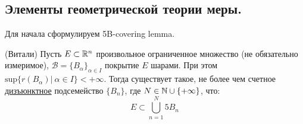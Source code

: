 \subsection{Элементы геометрической теории меры.}

Для начала сформулируем 5B-covering lemma.

\begin{lemma}
    (Витали) Пусть $E \subset \mathbb{R}^n$ произвольное ограниченное множество (не обязательно измеримое), $\mathcal{B} = \{B_{\alpha}\}_{\alpha \in I}$ покрытие $E$ шарами. При этом $\text{sup}\{r(B_{\alpha}) | \ \alpha \in I \} < +\infty.$ Тогда существует такое, не более чем счетное \underline{дизъюнктное} подсемейство $\{B_n\}$, где $N \in \mathbb{N} \cup \{+\infty\}$, что:
    $$E \subset \bigcup_{n = 1}^N 5B_n$$
\end{lemma}

